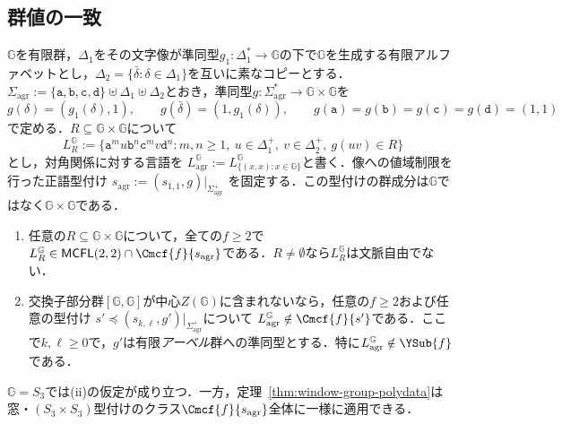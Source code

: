 \subsection{群値の一致}
\label{app:group-agreement}

${\mathbb G}$を有限群，$\Delta_1$をその文字像が準同型$g_1:\Delta_1^*\to {\mathbb G}$の下で${\mathbb G}$を生成する有限アルファベットとし，$\Delta_2=\{\bar\delta:\delta\in\Delta_1\}$を互いに素なコピーとする．
$\Sigma_{\mathrm{agr}}:=\{\mathtt a,\mathtt b,\mathtt c,\mathtt d\}\uplus\Delta_1\uplus\Delta_2$とおき，準同型$g:\Sigma_{\mathrm{agr}}^*\to {\mathbb G}\times {\mathbb G}$を
\[
 g(\delta)=(g_1(\delta),1),\qquad
 g(\bar\delta)=(1,g_1(\delta)),\qquad
 g(\mathtt a)=g(\mathtt b)=g(\mathtt c)=g(\mathtt d)=(1,1)
\]
で定める．$R\subseteq {\mathbb G}\times {\mathbb G}$について
\[
 L_R^{\mathbb G}:=\{\mathtt a^m u\mathtt b^n\mathtt c^m v\mathtt d^n:
 m,n\ge1,\ u\in\Delta_1^+,\ v\in\Delta_2^+,\ g(uv)\in R\}
\]
とし，対角関係に対する言語を
$L_{\mathrm{agr}}^{\mathbb G}:=L_{\{(x,x):x\in {\mathbb G}\}}^{\mathbb G}$と書く．像への値域制限を行った正語型付け
$s_{\mathrm{agr}}:=(s_{1,1},g)|_{\Sigma_{\mathrm{agr}}^+}$
を固定する．この型付けの群成分は${\mathbb G}$ではなく${\mathbb G}\times {\mathbb G}$である．

\begin{proposition}[順序付き群値をもつ素性の一致]
\label{prop:group-agreement}
\begin{enumerate}[label=\textup{(\roman*)},leftmargin=*]
\item 任意の$R\subseteq {\mathbb G}\times {\mathbb G}$について，全ての$f\ge2$で
$L_R^{\mathbb G}\in\mathsf{MCFL}(2,2)\cap\Cmcf{f}{s_{\mathrm{agr}}}$である．$R\ne\emptyset$なら$L_R^{\mathbb G}$は文脈自由でない．
\item 交換子部分群$[{\mathbb G},{\mathbb G}]$が中心$Z({\mathbb G})$に含まれないなら，任意の$f\ge2$および任意の型付け
$s'\preceq(s_{k,\ell},g')|_{\Sigma_{\mathrm{agr}}^+}$について
$L_{\mathrm{agr}}^{\mathbb G}\notin\Cmcf{f}{s'}$である．ここで$k,\ell\ge0$で，$g'$は有限\emph{アーベル}群への準同型とする．特に$L_{\mathrm{agr}}^{\mathbb G}\notin\YSub{f}$である．
\end{enumerate}
${\mathbb G}=S_3$では\textup{(ii)}の仮定が成り立つ．一方，定理~\ref{thm:window-group-polydata}は窓・$(S_3\times S_3)$型付けのクラス$\Cmcf{f}{s_{\mathrm{agr}}}$全体に一様に適用できる．
\end{proposition}

